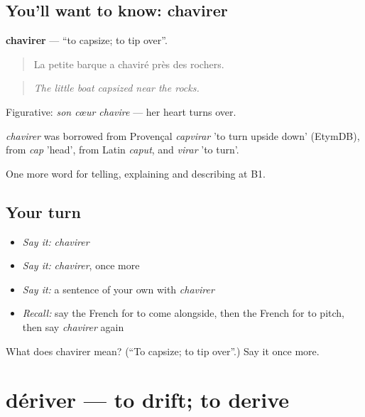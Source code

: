 \subsection*{You'll want to know: chavirer}
\textbf{chavirer} — \textquotedblleft{}to capsize; to tip over\textquotedblright{}.

\begin{quote}
La petite barque a chaviré près des rochers.
\end{quote}

\begin{quote}
\emph{The little boat capsized near the rocks.}
\end{quote}

Figurative: \emph{son cœur chavire} — her heart turns over.

\begin{cousinweb}
\emph{chavirer} was borrowed from Provençal \emph{capvirar} 'to turn upside down' (EtymDB), from \emph{cap} 'head', from Latin \emph{caput}, and \emph{virar} 'to turn'.
\end{cousinweb}

\begin{grammarlens}[title={What you've built}]
One more word for telling, explaining and describing at B1.
\end{grammarlens}

\subsection*{Your turn}
\begin{itemize}
\raggedright
  \item \emph{Say it:} \emph{chavirer}
  \item \emph{Say it:} \emph{chavirer}, once more
  \item \emph{Say it:} a sentence of your own with \emph{chavirer}
  \item \emph{Recall:} say the French for to come alongside, then the French for to pitch, then say \emph{chavirer} again
\end{itemize}

\begin{tcolorbox}[breakable,colback=teal!4,colframe=teal!35!black,title={Before you move on}]
What does chavirer mean? (\textquotedblleft{}To capsize; to tip over\textquotedblright{}.) Say it once more.
\end{tcolorbox}
\section[dériver]{dériver — to drift; to derive}


